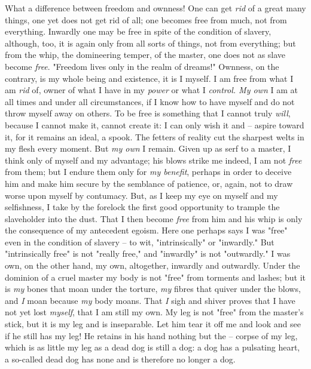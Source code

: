 \documentclass[a4paper]{book}
\begin{document}
What a difference between freedom and ownness! One can get \textit{rid} of a 
great many things, one yet does not get rid of all; one becomes free from 
much, not from everything. Inwardly one may be free in spite of the condition 
of slavery, although, too, it is again only from all sorts of things, not from 
everything; but from the whip, the domineering temper, of the master, one does 
not as slave become \textit{free}. "{}Freedom lives only in the realm of 
dreams!"{} Ownness, on the contrary, is my whole being and existence, it is I 
myself. I am free from what I am \textit{rid} of, owner of what I have in my 
\textit{power} or what I \textit{control. My own} I am at all times and under 
all circumstances, if I know how to have myself and do not throw myself away 
on others. To be free is something that I cannot truly \textit{will}, because 
I cannot make it, cannot create it: I can only wish it and -- aspire toward 
it, for it remains an ideal, a spook. The fetters of reality cut the sharpest 
welts in my flesh every moment. But \textit{my own} I remain. Given up as serf 
to a master, I think only of myself and my advantage; his blows strike me 
indeed, I am not \textit{free} from them; but I endure them only for 
\textit{my benefit}, perhaps in order to deceive him and make him secure by 
the semblance of patience, or, again, not to draw worse upon myself by 
contumacy. But, as I keep my eye on myself and my selfishness, I take by the 
forelock the first good opportunity to trample the slaveholder into the dust. 
That I then become \textit{free} from him and his whip is only the consequence 
of my antecedent egoism. Here one perhaps says I was "{}free"{} even in the 
condition of slavery -- to wit, "{}intrinsically"{} or "{}inwardly."{} But 
"{}intrinsically free"{} is not "{}really free,"{} and "{}inwardly"{} is not 
"{}outwardly."{} I was own, on the other hand, my own, altogether, inwardly 
and outwardly. Under the dominion of a cruel master my body is not "{}free"{} 
from torments and lashes; but it is \textit{my} bones that moan under the 
torture, \textit{my} fibres that quiver under the blows, and \textit{I} moan 
because \textit{my} body moans. That \textit{I} sigh and shiver proves that I 
have not yet lost \textit{myself}, that I am still my own. My leg is not 
"{}free"{} from the master's stick, but it is my leg and is inseparable. Let 
him tear it off me and look and see if he still has my leg! He retains in his 
hand nothing but the -- corpse of my leg, which is as little my leg as a dead 
dog is still a dog: a dog has a pulsating heart, a so-called dead dog has none 
and is therefore no longer a dog.
\end{document}
